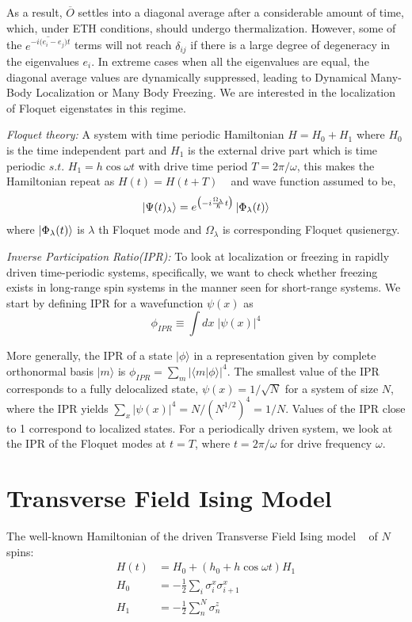 \documentclass[%
 reprint,
 amsmath,amssymb,
 aps,
]{revtex4-2}
\begin{document}
As a result, $\overline O$ settles into a diagonal average after a considerable amount of time, which, under ETH conditions, should undergo thermalization.
However, some of the $\overline{e^{-i\big(e_i-e_j\big)t}}$ terms will not reach $\delta_{ij}$ if there is a large degree of degeneracy in the eigenvalues $e_i$. In extreme cases when all the eigenvalues are equal, the diagonal average values are dynamically suppressed, leading to Dynamical Many-Body Localization or Many Body Freezing. We are interested in the localization of Floquet eigenstates in this regime.

\emph{Floquet theory:} A system with time periodic Hamiltonian $H = H_0 + H_1$ where $H_0$ is the time independent part and $H_1$ is the external drive part which is time periodic $s.t.$ $H_1 = h \cos{\omega t}$ with drive time period $T=2\pi/\omega$, this makes the Hamiltonian repeat as $H(t) = H(t+T)$ ~\cite{reichl_transition_2021} and wave function assumed to be,
\begin{equation}
\ket{\Psi(t)_\lambda} = e^{\big(-i\frac{\Omega_\lambda}{\hslash}t\big)} \ket{\Phi_\lambda (t)}
\end{equation}
where $\ket{\Phi_\lambda (t)}$ is $\lambda$ th Floquet mode and $\Omega_\lambda$ is corresponding Floquet qusienergy.

\emph{Inverse Participation Ratio(IPR):} To look at localization or freezing in rapidly driven time-periodic systems, specifically, we want to check whether freezing exists in long-range spin systems in the manner seen for short-range systems. We start by defining IPR for a wavefunction $\psi(x)$ as 
\begin{equation}
	\phi_{IPR}\equiv \int dx\;\vert\psi(x)\vert^4
\end{equation}

More generally, the IPR of a state $|\phi\rangle$ in a representation given by complete orthonormal basis $|m\rangle$ is $\phi_{IPR} = \sum_m\vert\langle m \vert\phi\rangle\vert^4$. The smallest value of the IPR corresponds to a fully delocalized state, $\psi(x)=1/\sqrt{N}$ for a system of size $N$, where the IPR yields $\sum_x |\psi(x)|^4=N/(N^{1/2})^4=1/N$. Values of the IPR close to 1 correspond to localized states. For a periodically driven system, we look at the IPR of the Floquet modes at $t=T$, where $t=2\pi/\omega$ for drive frequency $\omega$.


\section{\label{sec:level3} Transverse Field Ising Model}
The well-known Hamiltonian of the driven Transverse Field Ising model ~\cite{stinchcombe_ising_1973} of $N$ spins:
\begin{align*}
	H(t) &= H_0 + \left(h_0 + h\cos{\omega t}\right) H_1\\
	H_0 &= -\frac{1}{2}\sum_{i} \sigma^x_i \sigma^x_{i+1}\\
	H_1 &= -\frac{1}{2}\sum_n^N \sigma^z_{n}
\end{align*}
\end{document}

